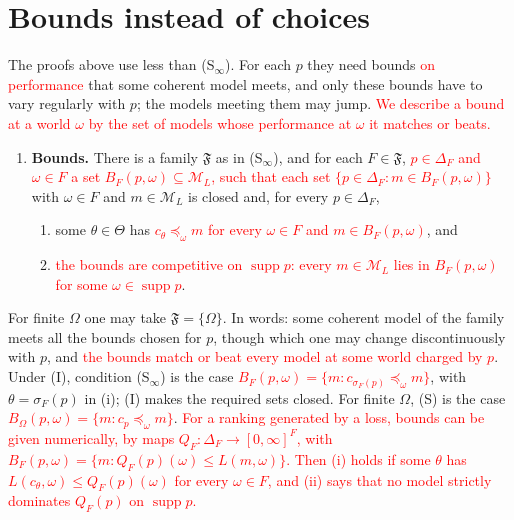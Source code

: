 \documentclass[11pt]{article}
\theoremstyle{definition}
\theoremstyle{remark}
\newcommand{\M}{\mathcal M}
\newcommand{\F}{\mathfrak F}
\newcommand{\supp}{\operatorname{supp}}
\begin{document}
\section{Bounds instead of choices}\label{sec:bounds}
The proofs above use less than (S$_\infty$). For each $p$ they need bounds \textcolor{red}{on performance} that some coherent model meets, and only these bounds have to vary regularly with $p$; the models meeting them may jump. \textcolor{red}{We describe a bound at a world $\omega$ by the set of models whose performance at $\omega$ it matches or beats.}
\begin{enumerate}[label=\textbf{(B)},leftmargin=*]
\item \textbf{Bounds.} There is a family $\F$ as in (S$_\infty$), and for each $F\in\F$, \textcolor{red}{$p\in\Delta_F$ and $\omega\in F$ a set $B_F(p,\omega)\subseteq\M_L$, such that each set $\{p\in\Delta_F:m\in B_F(p,\omega)\}$} with $\omega\in F$ and $m\in\M_L$ is closed and, for every $p\in\Delta_F$,
\begin{enumerate}[label=(\roman*)]
\item some $\theta\in\Theta$ has \textcolor{red}{$c_\theta\preceq_\omega m$ for every $\omega\in F$ and $m\in B_F(p,\omega)$}, and
\item \textcolor{red}{the bounds are competitive on $\supp p$: every $m\in\M_L$ lies in $B_F(p,\omega)$ for some $\omega\in\supp p$}.
\end{enumerate}
\end{enumerate}
For finite $\Omega$ one may take $\F=\{\Omega\}$. In words: some coherent model of the family meets all the bounds chosen for $p$, though which one may change discontinuously with $p$, and \textcolor{red}{the bounds match or beat every model at some world charged by $p$}. Under (I), condition (S$_\infty$) is the case \textcolor{red}{$B_F(p,\omega)=\{m:c_{\sigma_F(p)}\preceq_\omega m\}$}, with $\theta=\sigma_F(p)$ in (i); (I) makes the required sets closed. For finite $\Omega$, (S) is the case \textcolor{red}{$B_\Omega(p,\omega)=\{m:c_p\preceq_\omega m\}$}. \textcolor{red}{For a ranking generated by a loss, bounds can be given numerically, by maps $Q_F:\Delta_F\to[0,\infty]^F$, with $B_F(p,\omega)=\{m:Q_F(p)(\omega)\le L(m,\omega)\}$. Then (i) holds if some $\theta$ has $L(c_\theta,\omega)\le Q_F(p)(\omega)$ for every $\omega\in F$, and (ii) says that no model strictly dominates $Q_F(p)$ on $\supp p$.}
\end{document}
